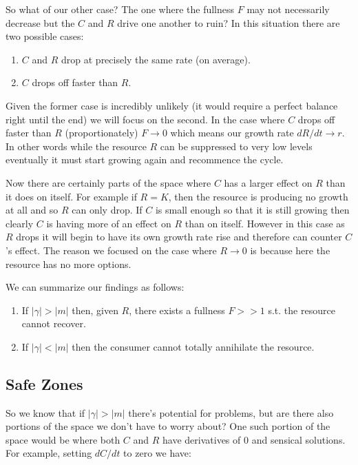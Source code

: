 \documentclass[11pt,a5paper]{book}
\begin{document}
So what of our other case? The one where the fullness $F$ may not necessarily decrease but the $C$ and $R$ drive one another to ruin? In this situation there are two possible cases:

\begin{enumerate}
\item $C$ and $R$ drop at precisely the same rate (on average).
\item $C$ drops off faster than $R$. 
\end{enumerate}

Given the former case is incredibly unlikely (it would require a perfect balance right until the end) we will focus on the second. In the case where $C$ drops off faster than $R$ (proportionately) $F\rightarrow 0$ which means our growth rate $dR/dt\rightarrow r$. In other words while the resource $R$ can be suppressed to very low levels eventually it must start growing again and recommence the cycle.
\newline

Now there are certainly parts of the space where $C$ has a larger effect on $R$ than it does on itself. For example if $R=K$, then the resource is producing no growth at all and so $R$ can only drop. If $C$ is small enough so that it is still growing then clearly $C$ is having more of an effect on $R$ than on itself. However in this case as $R$ drops it will begin to have its own growth rate rise and therefore can counter $C$'s effect. The reason we focused on the case where $R\rightarrow 0$ is because here the resource has no more options. \newline

We can summarize our findings as follows:

\begin{enumerate}
\item If $|\gamma| > |m|$ then, given $R$, there exists a fullness $F>>1$ s.t. the resource cannot recover.
\item If $|\gamma| < |m|$ then the consumer cannot totally annihilate the resource. 
\end{enumerate}

\subsection{Safe Zones}

So we know that if $|\gamma| > |m|$ there's potential for problems, but are there also portions of the space we don't have to worry about? One such portion of the space would be where both $C$ and $R$ have derivatives of 0 and sensical solutions. For example, setting $dC/dt$ to zero we have:
\end{document}
